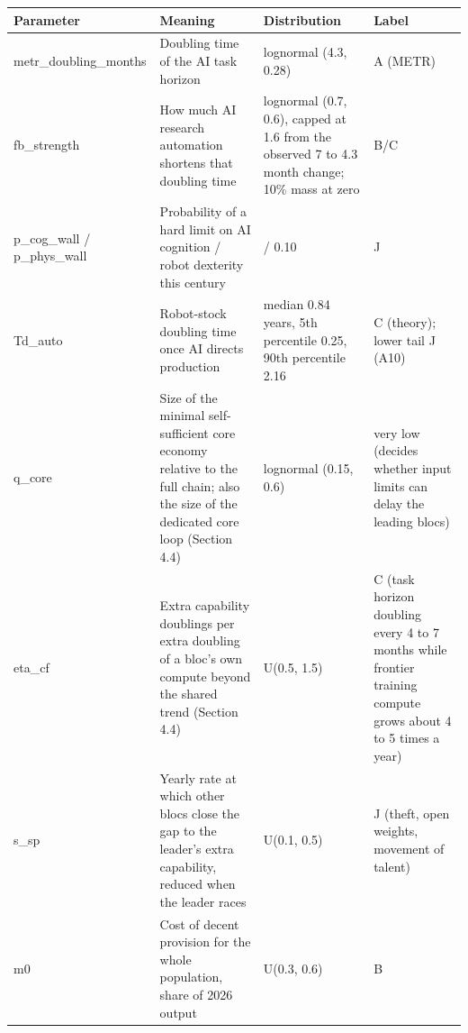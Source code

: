 \documentclass[
  10pt,
]{article}
\newcounter{none} %
\begin{document}
{\def\LTcaptype{none} %
\begin{longtable}[]{@{}
  >{\raggedright\arraybackslash}p{}
  >{\raggedright\arraybackslash}p{}
  >{\raggedright\arraybackslash}p{}
  >{\raggedright\arraybackslash}p{}@{}}
\toprule\noalign{}
\begin{minipage}[b]{\linewidth}\raggedright
Parameter
\end{minipage} & \begin{minipage}[b]{\linewidth}\raggedright
Meaning
\end{minipage} & \begin{minipage}[b]{\linewidth}\raggedright
Distribution
\end{minipage} & \begin{minipage}[b]{\linewidth}\raggedright
Label
\end{minipage} \\
\midrule\noalign{}
\endhead
\bottomrule\noalign{}
\endlastfoot
metr\_doubling\_months & Doubling time of the AI task horizon & lognormal (4.3, 0.28) & A (METR) \\
fb\_strength & How much AI research automation shortens that doubling time & lognormal (0.7, 0.6),
capped at 1.6 from the observed 7 to 4.3 month change; 10\% mass at zero & B/C \\
p\_cog\_wall / p\_phys\_wall & Probability of a hard limit on AI cognition / robot dexterity this
century & 0.12 / 0.10 & J \\
Td\_auto & Robot-stock doubling time once AI directs production & median 0.84 years, 5th percentile
0.25, 90th percentile 2.16 & C (theory); lower tail J (A10) \\
q\_core & Size of the minimal self-sufficient core economy relative to the full chain; also the size
of the dedicated core loop (Section 4.4) & lognormal (0.15, 0.6) & very low (decides whether input
limits can delay the leading blocs) \\
eta\_cf & Extra capability doublings per extra doubling of a bloc's own compute beyond the shared
trend (Section 4.4) & U(0.5, 1.5) & C (task horizon doubling every 4 to 7 months while frontier
training compute grows about 4 to 5 times a year) \\
s\_sp & Yearly rate at which other blocs close the gap to the leader's extra capability, reduced
when the leader races & U(0.1, 0.5) & J (theft, open weights, movement of talent) \\
m0 & Cost of decent provision for the whole population, share of 2026 output & U(0.3, 0.6) & B \\
\end{longtable}
}
\end{document}
